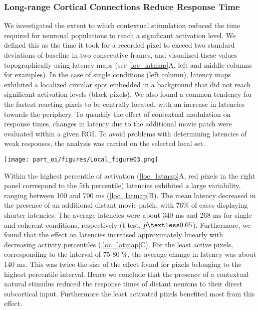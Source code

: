 	\subsubsection{Long-range Cortical Connections Reduce Response Time}

\label{oi_local_latency} 

We investigated the extent to which contextual stimulation reduced the time
required for neuronal populations to reach a significant activation level.
We defined this as the time it took for a recorded pixel to exceed two
standard deviations of baseline in two consecutive frames, and visualized
these values topographically using latency maps (see \ref{loc_latmap}A,
left and middle columns for examples).  In the case of single conditions
(left column), latency maps exhibited a localized circular spot embedded in
a background that did not reach significant activation levels (black
pixels). We also found a common tendency for the fastest reacting pixels to
be centrally located, with an increase in latencies towards the periphery.
To quantify the effect of contextual modulation on response times, changes
in latency due to the additional movie patch were evaluated within a given
ROI. To avoid problems with determining latencies of weak responses, the
analysis was carried on the selected local set.  
	
	\begin{SCfigure}[50][!h]
	\texttt{[image: part\_oi/figures/Local\_figure03.png]}
	\caption[Effects of Contextual Stimulation on the Latency of Activation.]{\protect}	
	\label{loc_latmap}
	\end{SCfigure} 


Within the highest percentile of activation (\ref{loc_latmap}A, red pixels
in the right panel correspond to the 5th percentile) latencies exhibited a
large variability, ranging between 100 and 700 ms (\ref{loc_latmap}B). The
mean latency decreased in the presence of an additional distant movie
patch, with 76\% of cases displaying shorter latencies. The average
latencies were about 340 ms and 268 ms for single and coherent conditions,
respectively (t-test, $p \textless 0.05$). Furthermore, we found that the
effect on latencies increased approximately linearly with decreasing
activity percentiles (\ref{loc_latmap}C). For the least active pixels,
corresponding to the interval of 75-80 \%, the average change in latency
was about 140 ms. This was twice the size of the effect found for pixels
belonging to the highest percentile interval. Hence we conclude that the
presence of a contextual natural stimulus reduced the response times of
distant neurons to their direct subcortical input. Furthermore the least
activated pixels benefited most from this effect.

